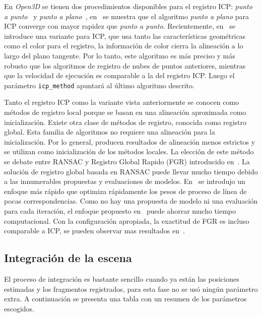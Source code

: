 En \textit{Open3D} se tienen dos procedimientos disponibles para el registro ICP: \textit{punto a punto}~\cite{besl1992method}  y \textit{punto a plano}~\cite{chen1992object}, en~\cite{rusinkiewicz2001efficient} se muestra que el algoritmo \textit{punto a plano} para ICP converge con mayor rapidez que \textit{punto a punto}. Recientemente, en~\cite{park2017colored} se introduce una variante para ICP, que usa tanto las características geométricas como el color para el registro, la información de color cierra la alineación a lo largo del plano tangente. Por lo tanto, este algoritmo es más preciso y más robusto que los algoritmos de registro de nubes de puntos anteriores, mientras que la velocidad de ejecución es comparable a la del registro ICP. Luego el parámetro \verb|icp_method| apuntará al último algoritmo descrito.

Tanto el registro ICP como la variante vista anteriormente se conocen como métodos de registro local porque se basan en una alineación aproximada como inicialización. Existe otra clase de métodos de registro, conocida como registro global. Esta familia de algoritmos no requiere una alineación para la inicialización. Por lo general, producen resultados de alineación menos estrictos y se utilizan como inicialización de los métodos locales. La elección de este método se debate entre RANSAC y Registro Global Rapido (FGR) introducido en~\cite{zhou2016fast}. La solución de registro global basada en RANSAC puede llevar mucho tiempo debido a las innumerables propuestas y evaluaciones de modelos. En~\cite{zhou2016fast} se introdujo un enfoque más rápido que optimiza rápidamente los pesos de proceso de línea de pocas correspondencias. Como no hay una propuesta de modelo ni una evaluación para cada iteración, el enfoque propuesto en~\cite{zhou2016fast} puede ahorrar mucho tiempo computacional. Con la configuración apropiada, la exactitud de FGR es incluso comparable a ICP, se pueden observar mas resultados en~\cite{zhou2016fast}.

\subsection{Integración de la escena}

El proceso de integración es bastante sencillo cuando ya están las posiciones estimadas y los fragmentos registrados, para esta fase no se usó ningún parámetro extra. A continuación se presenta una tabla con un resumen de los parámetros escogidos.



